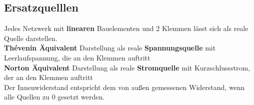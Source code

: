 																				\subsection{Ersatzquelllen}


																				\beginip
																				Jedes Netzwerk mit \textbf{linearen} Bauelementen und 2 Klemmen lässt sich als reale Quelle darstellen. \\
																				\textbf{Thévenin Äquivalent} Darstellung als reale \textbf{Spannungsquelle} mit Leerlaufspannung, die an den Klemmen auftritt \\
																				\textbf{Norton Äquivalent} Darstellung als reale \textbf{Stromquelle}  mit Kurzschlussstrom, der an den Klemmen auftritt\\
																				Der Innenwiderstand entspricht dem von außen gemessenen Widerstand, wenn alle Quellen zu 0 gesetzt werden.
																				\begin{center}
																					\fix
																				\end{center}
																				\iend


